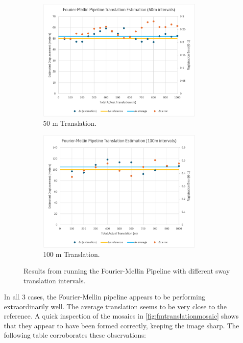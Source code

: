 \begin{figure}[H]
    \begin{subfigure}[b]{\textwidth}
        \centering
        \includegraphics[width=0.9\textwidth]{figures/results/Translation-Graph/FMT-4.png}
        \caption{50 m Translation.}
    \end{subfigure}
    \hfill
    \begin{subfigure}[b]{\textwidth}
        \centering
        \includegraphics[width=0.9\textwidth]{figures/results/Translation-Graph/FMT-9.png}
        \caption{100 m Translation.}
    \end{subfigure}
    \hfill
    \caption{Results from running the Fourier-Mellin Pipeline with different sway translation intervals.}
\end{figure}

In all 3 cases, the Fourier-Mellin pipeline appears to be performing extraordinarily well. The average translation seems to be very close to the reference. A quick inspection of the mosaics in \autoref{fig:fmtranslationmosaic} shows that they appear to have been formed correctly, keeping the image sharp. The following table corroborates these observations:


